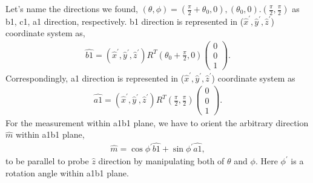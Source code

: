 \documentclass[a4,10.5pt]{report}
\begin{document}
Let's name the directions we found, $(\theta,\phi) = (\frac{\pi}{2}+\theta_0,0), (\theta_0,0). (\frac{\pi}{2}, \frac{\pi}{2})$ as b1, c1, a1 direction, respectively.
b1 direction is represented in ($\hat{x}^\prime, \hat{y}^\prime, \hat{z}^\prime$) coordinate system as, 
\begin{align}
\widehat{b1} = 
(\hat{x}^\prime, \hat{y}^\prime, \hat{z}^\prime) R^T (\theta_0 + \frac{\pi}{2}, 0) 
\left(
\begin{array}{c}
0 \\
0 \\
1
\end{array}
\right).
\end{align}
Correspondingly, a1 direction is represented in ($\hat{x}^\prime, \hat{y}^\prime, \hat{z}^\prime$) coordinate system as 
\begin{align}
\widehat{a1} = 
(\hat{x}^\prime, \hat{y}^\prime, \hat{z}^\prime) R^T (\frac{\pi}{2}, \frac{\pi}{2}) 
\left(
\begin{array}{c}
0 \\
0 \\
1
\end{array}
\right).
\end{align}
For the measurement within a1b1 plane, we have to orient the arbitrary direction $\hat{m}$ within a1b1 plane,
\begin{align}
\label{m}
\hat{m} = \cos\phi^\prime\widehat{b1} + \sin\phi^\prime\widehat{a1},
\end{align}
to be parallel to probe $\hat{z}$ direction by manipulating both of $\theta$ and $\phi$.
Here $\phi^\prime$ is a rotation angle within a1b1 plane.
\end{document}
